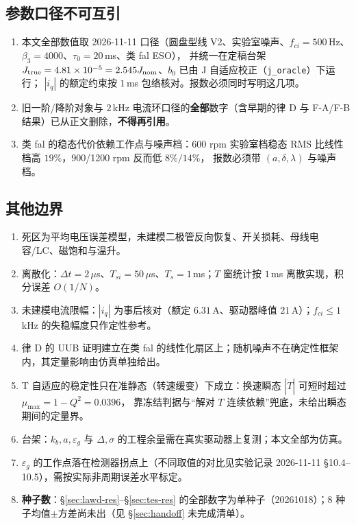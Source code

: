 \documentclass[11pt,a4paper]{article}
\theoremstyle{remark}\newtheorem{remark}{注}
\begin{document}
\subsection{参数口径不可互引}\label{sec:limit-param}
\begin{enumerate}
\item[(F1)] 本文全部数值取 2026-11-11 口径（圆盘型线 V2、实验室噪声、$f_{ci}=500$\,Hz、$\beta_3=4000$、$\tau_0=20$\,ms、类 fal ESO），
      并统一在定稿台架 $J_{\rm true}=4.81\times10^{-5}=2.545J_{\rm nom}$、$b_0$ 已由 J 自适应校正（\texttt{j\_oracle}）下运行；
      $|i_q|$ 的额定约束按 $1$\,ms 包络核对。报数必须同时写明这几项。
\item[(F2)] 旧一阶/降阶对象与 $2$\,kHz 电流环口径的\textbf{全部}数字（含早期的律 D 与 F-A/F-B 结果）已从正文删除，\textbf{不得再引用}。
\item[(F3)] 类 fal 的稳态代价依赖工作点与噪声档：600 rpm 实验室档稳态 RMS 比线性档高 $19\%$，900/1200 rpm 反而低 $8\%/14\%$，
      报数必须带 $(a,\delta,\lambda)$ 与噪声档。
\end{enumerate}

\subsection{其他边界}
\begin{enumerate}
\item[(P1)] 死区为平均电压误差模型，未建模二极管反向恢复、开关损耗、母线电容/LC、磁饱和与温升。
\item[(P2)] 离散化：$\Delta t=2\,\mu$s、$T_{si}=50\,\mu$s、$T_s=1$\,ms；$T$ 窗统计按 $1$\,ms 离散实现，积分误差 $O(1/N)$。
\item[(P3)] 未建模电流限幅：$|i_q|$ 为事后核对（额定 $6.31$\,A、驱动器峰值 $21$\,A）；$f_{ci}\le1$\,kHz 的失稳幅度只作定性参考。
\item[(P4)] 律 D 的 UUB 证明建立在类 fal 的线性化扇区上；随机噪声不在确定性框架内，其定量影响由仿真单独给出。
\item[(P5)] T 自适应的稳定性只在准静态（转速缓变）下成立：换速瞬态 $|\dot T|$ 可短时超过 $\mu_{\max}=1-Q^{2}=0.0396$，
      靠冻结判据与“解对 $T$ 连续依赖”兜底，未给出瞬态期间的定量界。
\item[(P6)] 台架：$k_b,a,\varepsilon_g$ 与 $\Delta,\sigma$ 的工程余量需在真实驱动器上复测；本文全部为仿真。
\item[(P7)] $\varepsilon_g$ 的工作点落在检测器拐点上（不同取值的对比见实验记录 2026-11-11 §10.4--10.5），需按实际非周期误差水平标定。
\item[(P8)] \textbf{种子数}：§\ref{sec:lawd-res}--§\ref{sec:tes-res} 的全部数字为单种子（20261018）；8 种子均值$\pm$方差尚未出（见 §\ref{sec:handoff} 未完成清单）。
\end{enumerate}
\end{document}
